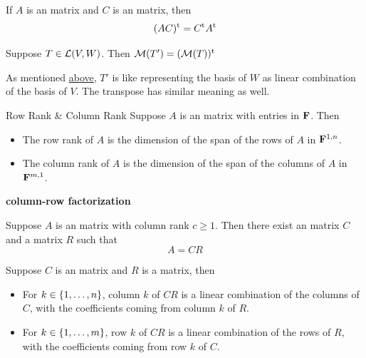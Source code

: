 \documentclass[12pt,a4paper]{article}
\begin{document}
    \begin{prop}
        If $A$ is an  matrix and $C$ is an  matrix, then
        $$
        (AC)^\mathrm{t}=C^\mathrm{t}A^\mathrm{t}
        $$
    \end{prop}
    \hfill
    
    \begin{prop}
        Suppose $T\in\mathcal{L}(V,W)$. Then $\mathcal{M}(T')=(\mathcal{M}(T))^\mathrm{t}$
    \end{prop}
    \begin{remark}
        As mentioned \hyperref[3.66r1]{above}, $T'$ is like representing the basis of $W$ as linear combination of the basis of $V$. The transpose has similar meaning as well.
    \end{remark}
    \hfill

    \begin{defi}{Row Rank \& Column Rank}
        Suppose $A$ is an  matrix with entries in $\mathbf{F}$. Then
        \begin{itemize}
            \item The row rank of $A$ is the dimension of the span of the rows of $A$ in $\mathbf{F}^{1,n}$.
            \item The column rank of $A$ is the dimension of the span of the columns of $A$ in $\mathbf{F}^{m,1}$.
        \end{itemize}
    \end{defi}
    \hfill

    \begin{prop}
        \textbf{column-row factorization}

        Suppose $A$ is an  matrix with column rank $c\geq1$. Then there exist an  matrix $C$ and a  matrix $R$ such that 
        $$
        A=CR
        $$
    \end{prop}
    \begin{prop}
        Suppose $C$ is an  matrix and $R$ is a  matrix, then
        \begin{itemize}
            \item For $k\in\left\{1,\dots,n\right\}$, column $k$ of $CR$ is a linear combination of the columns of $C$, with the coefficients coming from column $k$ of $R$.
            \item For $k\in\left\{1,\dots,m\right\}$, row $k$ of $CR$ is a linear combination of the rows of $R$, with the coefficients coming from row $k$ of $C$.
        \end{itemize}
    \end{prop}
    \hfill
\end{document}
